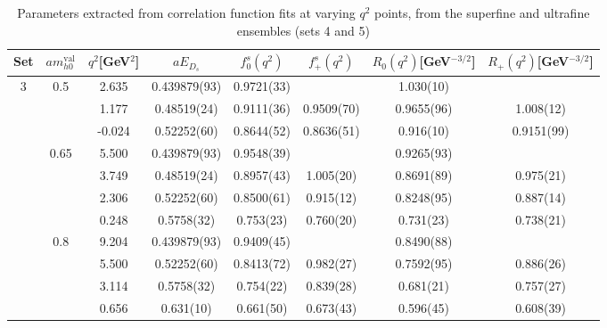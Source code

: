 \begin{table}
  \begin{center}
    \begin{tabular}{ c c c c c c c c }
      \hline
      Set & $am_{h0}^{\text{val}}$ & $q^2$[GeV$^2$]& $aE_{D_s}$& $f^s_0(q^2)$& $f^s_+(q^2)$& $R_0(q^2)$[GeV$^{-3/2}$]& $R_+(q^2)$[GeV$^{-3/2}$]\\ [0.5ex]
      \hline\hline 
      3 & 0.5 & 2.635 & 0.439879(93) & 0.9721(33) &  & 1.030(10) & \\ [0.5ex]
      &  & 1.177 & 0.48519(24) & 0.9111(36) & 0.9509(70) & 0.9655(96) & 1.008(12)\\ [0.5ex]
      &  & -0.024 & 0.52252(60) & 0.8644(52) & 0.8636(51) & 0.916(10) & 0.9151(99)\\ [0.5ex]
      \hline 
      & 0.65 & 5.500 & 0.439879(93) & 0.9548(39) &  & 0.9265(93) & \\ [0.5ex]
      &  & 3.749 & 0.48519(24) & 0.8957(43) & 1.005(20) & 0.8691(89) & 0.975(21)\\ [0.5ex]
      &  & 2.306 & 0.52252(60) & 0.8500(61) & 0.915(12) & 0.8248(95) & 0.887(14)\\ [0.5ex]
      &  & 0.248 & 0.5758(32) & 0.753(23) & 0.760(20) & 0.731(23) & 0.738(21)\\ [0.5ex]
      \hline 
      & 0.8 & 9.204 & 0.439879(93) & 0.9409(45) &  & 0.8490(88) & \\ [0.5ex]
      &  & 5.500 & 0.52252(60) & 0.8413(72) & 0.982(27) & 0.7592(95) & 0.886(26)\\ [0.5ex]
      &  & 3.114 & 0.5758(32) & 0.754(22) & 0.839(28) & 0.681(21) & 0.757(27)\\ [0.5ex]
      &  & 0.656 & 0.631(10) & 0.661(50) & 0.673(43) & 0.596(45) & 0.608(39)\\ [0.5ex]
      \hline\hline 
    \end{tabular}
    \caption{Parameters extracted from correlation function fits at varying $q^2$ points, from the superfine and ultrafine ensembles (sets 4 and 5) \label{tab:kinetic2}}
    \end{center}
\end{table}
